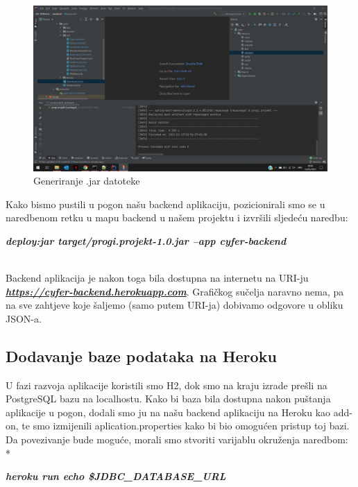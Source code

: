 		 \begin{figure}[H]
		 
			\includegraphics[scale=0.37]{slike/pustanje1.jpg}
			\caption{Generiranje .jar datoteke}
			\label{fig:pustanje1}
			\centering
		\end{figure}
		
		
		Kako bismo pustili u pogon našu backend aplikaciju, pozicionirali smo se u naredbenom retku u mapu backend u našem projektu i izvršili sljedeću naredbu:
		
		\centerline{
		\textbf{\textit{deploy:jar target/progi.projekt-1.0.jar --app cyfer-backend}}}
	
		~\\
		\noindent
		Backend aplikacija je nakon toga bila dostupna na internetu na URI-ju \textbf{\textit{\href{https://cyfer-backend.herokuapp.com}{https://cyfer-backend.herokuapp.com}}}. Grafičkog sučelja naravno nema, pa na sve zahtjeve koje šaljemo (samo putem URI-ja) dobivamo odgovore u obliku JSON-a.
		
		\subsection{Dodavanje baze podataka na Heroku}
		U fazi razvoja aplikacije koristili smo H2, dok smo na kraju izrade prešli na PostgreSQL bazu na localhostu. Kako bi baza bila dostupna nakon puštanja aplikacije u pogon, dodali smo ju na našu backend aplikaciju na Heroku kao add-on, te smo izmijenili aplication.properties kako bi bio omogućen pristup toj bazi. Da povezivanje bude moguće, morali smo stvoriti varijablu okruženja naredbom:
		\newline
		\\*
		\centerline{\textbf{
		\textit{heroku run echo \$JDBC\_DATABASE\_URL}}}
		
